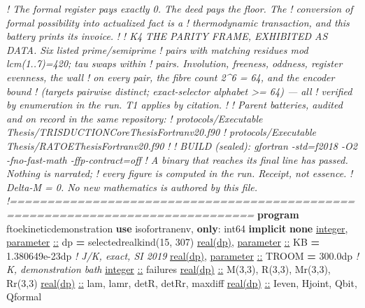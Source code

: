 \documentclass[10pt]{article}
\renewcommand{\_}{\origunderscore\allowbreak}
\newenvironment{Shaded}{}{}
\newcommand{\CommentTok}[1]{\textit{#1}}
\newcommand{\DataTypeTok}[1]{\underline{#1}}
\newcommand{\DecValTok}[1]{#1}
\newcommand{\FloatTok}[1]{#1}
\newcommand{\FunctionTok}[1]{#1}
\newcommand{\KeywordTok}[1]{\textbf{#1}}
\newcommand{\NormalTok}[1]{#1}
\begin{document}
\begin{Shaded}
\begin{Highlighting}[]
\CommentTok{!      The formal register pays exactly 0. The deed pays the floor. The}
\CommentTok{!      conversion of formal possibility into actualized fact is a}
\CommentTok{!      thermodynamic transaction, and this battery prints its invoice.}
\CommentTok{!}
\CommentTok{!  K4  THE PARITY FRAME, EXHIBITED AS DATA. Six listed prime/semiprime}
\CommentTok{!      pairs with matching residues mod lcm(1..7)=420; tau swaps within}
\CommentTok{!      pairs. Involution, freeness, oddness, register evenness, the wall}
\CommentTok{!      on every pair, the fibre count 2\^{}6 = 64, and the encoder bound}
\CommentTok{!      (targets pairwise distinct; exact{-}selector alphabet \textgreater{}= 64) — all}
\CommentTok{!      verified by enumeration in the run. T1 applies by citation.}
\CommentTok{!}
\CommentTok{!  Parent batteries, audited and on record in the same repository:}
\CommentTok{!    protocols/Executable Thesis/TRISDUCTION\_Core\_Thesis\_Fortran\_v2\_4\_0.f90}
\CommentTok{!    protocols/Executable Thesis/RA\_TOE\_Thesis\_Fortran\_v2\_0\_0.f90}
\CommentTok{!}
\CommentTok{!  BUILD (sealed): gfortran {-}std=f2018 {-}O2 {-}fno{-}fast{-}math {-}ffp{-}contract=off}
\CommentTok{!  A binary that reaches its final line has passed. Nothing is narrated;}
\CommentTok{!  every figure is computed in the run. Receipt, not essence.}
\CommentTok{!  Delta{-}M = 0. No new mathematics is authored by this file.}
\CommentTok{!===============================================================================}
\KeywordTok{program}\NormalTok{ ftoe\_kinetic\_demonstration}
  \KeywordTok{use}\NormalTok{ iso\_fortran\_env, }\KeywordTok{only}\NormalTok{: int64}
  \KeywordTok{implicit} \KeywordTok{none}
  \DataTypeTok{integer}\NormalTok{, }\DataTypeTok{parameter} \DataTypeTok{::}\NormalTok{ dp }\KeywordTok{=} \FunctionTok{selected\_real\_kind}\NormalTok{(}\DecValTok{15}\NormalTok{, }\DecValTok{307}\NormalTok{)}
  \DataTypeTok{real(dp)}\NormalTok{, }\DataTypeTok{parameter} \DataTypeTok{::}\NormalTok{ KB }\KeywordTok{=} \FloatTok{1.380649e{-}23\_dp}          \CommentTok{! J/K, exact, SI 2019}
  \DataTypeTok{real(dp)}\NormalTok{, }\DataTypeTok{parameter} \DataTypeTok{::}\NormalTok{ T\_ROOM }\KeywordTok{=} \FloatTok{300.0\_dp}             \CommentTok{! K, demonstration bath}
  \DataTypeTok{integer} \DataTypeTok{::}\NormalTok{ failures}
  \DataTypeTok{real(dp)} \DataTypeTok{::}\NormalTok{ M(}\DecValTok{3}\NormalTok{,}\DecValTok{3}\NormalTok{), R(}\DecValTok{3}\NormalTok{,}\DecValTok{3}\NormalTok{), Mr(}\DecValTok{3}\NormalTok{,}\DecValTok{3}\NormalTok{), Rr(}\DecValTok{3}\NormalTok{,}\DecValTok{3}\NormalTok{)}
  \DataTypeTok{real(dp)} \DataTypeTok{::}\NormalTok{ lam, lamr, detR, detRr, maxdiff}
  \DataTypeTok{real(dp)} \DataTypeTok{::}\NormalTok{ I\_even, H\_joint, Q\_bit, Q\_formal}


\end{Highlighting}
\end{Shaded}
\end{document}
